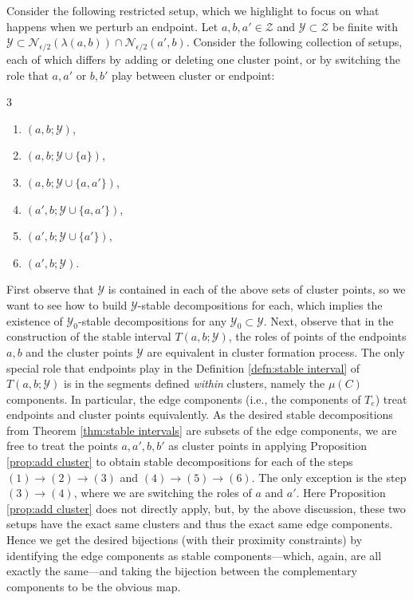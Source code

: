 \documentclass{amsart}
\theoremstyle{definition}
\theoremstyle{remark}
\theoremstyle{definition}
\newcommand{\calN}{\mathcal{N}}
\newcommand{\calY}{\mathcal{Y}}
\newcommand{\calZ}{\mathcal{Z}}
\begin{document}
Consider the following restricted setup, which we highlight to focus on what happens when we perturb an endpoint.  Let $a,b,a' \in \calZ$ and $\calY \subset \calZ$ be finite with $\calY \subset \calN_{\epsilon/2}(\lambda(a,b)) \cap \calN_{\epsilon/2}(a',b)$.  Consider the following collection of setups, each of which differs by adding or deleting one cluster point, or by switching the role that $a,a'$ or $b,b'$ play between cluster or endpoint:
\vspace{-.09in}
\begin{multicols}{3}
\begin{enumerate}
\item $(a,b;\calY)$,
\item $(a,b;\calY \cup \{a\})$,
\item $(a,b;\calY \cup \{a, a'\})$,
\item $(a',b;\calY \cup \{a,a'\})$,
\item $(a',b;\calY \cup \{a'\})$,
\item $(a',b;\calY)$.
\end{enumerate}
\end{multicols}

First observe that $\calY$ is contained in each of the above sets of cluster points, so we want to see how to build $\calY$-stable decompositions for each, which implies the existence of $\calY_0$-stable decompositions for any $\calY_0 \subset \calY$.  Next, observe that in the construction of the stable interval $T(a,b;\calY)$, the roles of points of the endpoints $a,b$ and the cluster points $\calY$ are equivalent in cluster formation process.  The only special role that endpoints play in the Definition \ref{defn:stable interval} of $T(a,b;\calY)$ is in the segments defined \emph{within} clusters, namely the $\mu(C)$ components.  In particular, the edge components (i.e., the components of $T_e$) treat endpoints and cluster points equivalently.  As the desired stable decompositions from Theorem \ref{thm:stable intervals} are subsets of the edge components, we are free to treat the points $a,a',b,b'$ as cluster points in applying Proposition \ref{prop:add cluster} to obtain stable decompositions for each of the steps $(1) \to (2) \to (3)$ and $(4) \to (5) \to (6)$.  The only exception is the step $(3) \to (4)$, where we are switching the roles of $a$ and $a'$.  Here Proposition \ref{prop:add cluster} does not directly apply, but, by the above discussion, these two setups have the exact same clusters and thus the exact same edge components.  Hence we get the desired bijections (with their proximity constraints) by identifying the edge components as stable components---which, again, are all exactly the same---and taking the bijection between the complementary components to be the obvious map.
\end{document}
